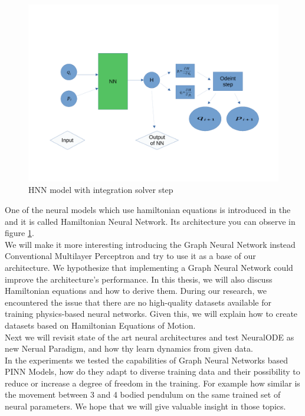 \begin{figure}[h!]
	\includegraphics[width=15cm]{chapters/chapter1/hnn}
	\caption{HNN model with integration solver step}
	\label{fig:hnn}
\end{figure}
One of the neural models which use hamiltonian equations is introduced in the \cite{hnn} and it is called Hamiltonian Neural Network. Its architecture you can observe in figure \ref{fig:hnn}.\\
We will make it more interesting introducing the Graph Neural Network instead Conventional Multilayer Perceptron and try to use it as a base of our architecture. We hypothesize that implementing a Graph Neural Network could improve the architecture's performance. 
In this thesis, we will also discuss Hamiltonian equations and how to derive them. During our research, we encountered the issue that there are no high-quality datasets available for training physics-based neural networks. Given this, we will explain how to create datasets based on Hamiltonian Equations of Motion.\\
Next we will revisit state of the art neural architectures and test NeuralODE as new Nerual Paradigm, and how thy learn dynamics from given data.\\
In the experiments we tested the capabilities of Graph Neural Networks based PINN Models, how do they adapt to diverse training data and their possibility to reduce or increase a degree of freedom in the training. For example how similar is the movement between 3 and 4 bodied pendulum on the same trained set of neural parameters. We hope that we will give valuable insight in those topics.    








